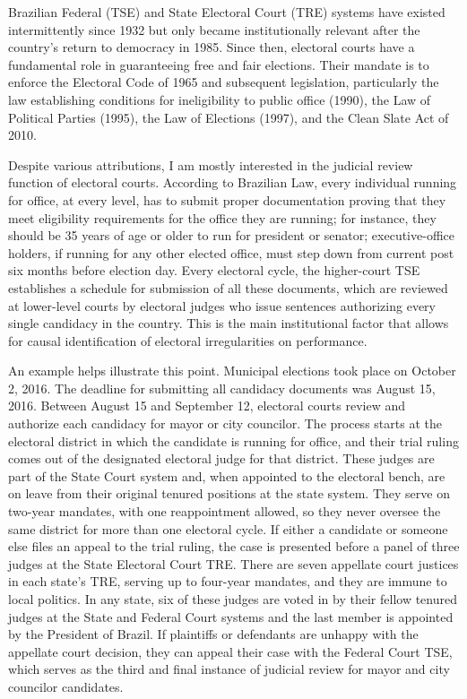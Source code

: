 \documentclass[11pt]{article}
\begin{document}
Brazilian Federal (TSE) and State Electoral Court (TRE) systems have existed intermittently since 1932 but only became institutionally relevant after the country's return to democracy in 1985. Since then, electoral courts have a fundamental role in guaranteeing free and fair elections. Their mandate is to enforce the Electoral Code of 1965 and subsequent legislation, particularly the law establishing conditions for ineligibility to public office (1990), the Law of Political Parties (1995), the Law of Elections (1997), and the Clean Slate Act of 2010.

Despite various attributions, I am mostly interested in the judicial review function of electoral courts. According to Brazilian Law, every individual running for office, at every level, has to submit proper documentation proving that they meet eligibility requirements for the office they are running; for instance, they should be 35 years of age or older to run for president or senator; executive-office holders, if running for any other elected office, must step down from current post six months before election day. Every electoral cycle, the higher-court TSE establishes a schedule for submission of all these documents, which are reviewed at lower-level courts by electoral judges who issue sentences authorizing every single candidacy in the country. This is the main institutional factor that allows for causal identification of electoral irregularities on performance.

An example helps illustrate this point. Municipal elections took place on October 2, 2016. The deadline for submitting all candidacy documents was August 15, 2016. Between August 15 and September 12, electoral courts review and authorize each candidacy for mayor or city councilor. The process starts at the electoral district in which the candidate is running for office, and their trial ruling comes out of the designated electoral judge for that district. These judges are part of the State Court system and, when appointed to the electoral bench, are on leave from their original tenured positions at the state system. They serve on two-year mandates, with one reappointment allowed, so they never oversee the same district for more than one electoral cycle. If either a candidate or someone else files an appeal to the trial ruling, the case is presented before a panel of three judges at the State Electoral Court TRE. There are seven appellate court justices in each state's TRE, serving up to four-year mandates, and they are immune to local politics. In any state, six of these judges are voted in by their fellow tenured judges at the State and Federal Court systems and the last member is appointed by the President of Brazil. If plaintiffs or defendants are unhappy with the appellate court decision, they can appeal their case with the Federal Court TSE, which serves as the third and final instance of judicial review for mayor and city councilor candidates.
\end{document}
